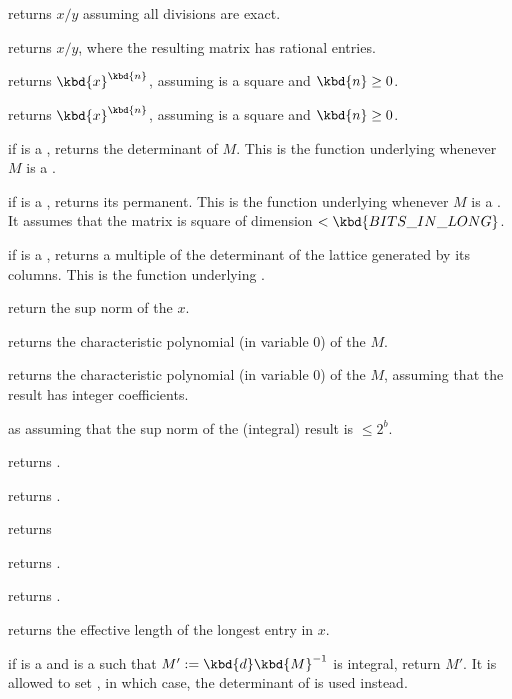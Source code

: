  returns $x/y$ assuming all divisions
are exact.

 returns $x/y$, where the resulting matrix
has rational entries.

 returns $\kbd{x}^\kbd{n}$, assuming 
is a square  and $\kbd{n}\geq 0$.

 returns $\kbd{x}^\kbd{n}$, assuming 
is a square  and $\kbd{n}\geq 0$.

 if  is a , returns the determinant of
$M$. This is the function underlying  whenever $M$ is a .

 if  is a , returns its
permanent. This is the function underlying  whenever $M$
is a . It assumes that the matrix is square of dimension $<
\kbd{BITS\_IN\_LONG}$.

 if  is a , returns a multiple of
the determinant of the lattice generated by its columns. This is the function
underlying .

 return the sup norm of the  $x$.

 returns the characteristic polynomial (in
variable $0$) of the  $M$.

 returns the characteristic polynomial
(in variable $0$) of the  $M$, assuming that the result has integer
coefficients.

 as 
assuming that the sup norm of the (integral) result is $\leq 2^b$.

 returns .

 returns .

 returns 

 returns .

 returns .

 returns the effective length of the longest
entry in $x$.

 if  is a  and 
is a  such that $M' := \kbd{d}\kbd{M}^{-1}$ is integral,
return $M'$. It is allowed to set , in which case, the
determinant of  is used instead.

